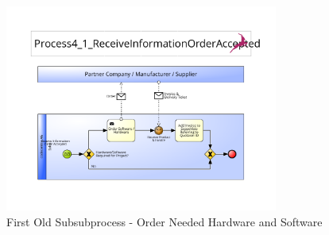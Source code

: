 \begin{figure}[h]
	\begin{center}
		\includegraphics[width=0.8\textwidth]{./appendix/pbmnOld/0-4-1_orderSoftware.pdf}
		\caption{First Old Subsubprocess - Order Needed Hardware and Software}\label{fig:0-4-1_subsub}
	\end{center}
\end{figure}